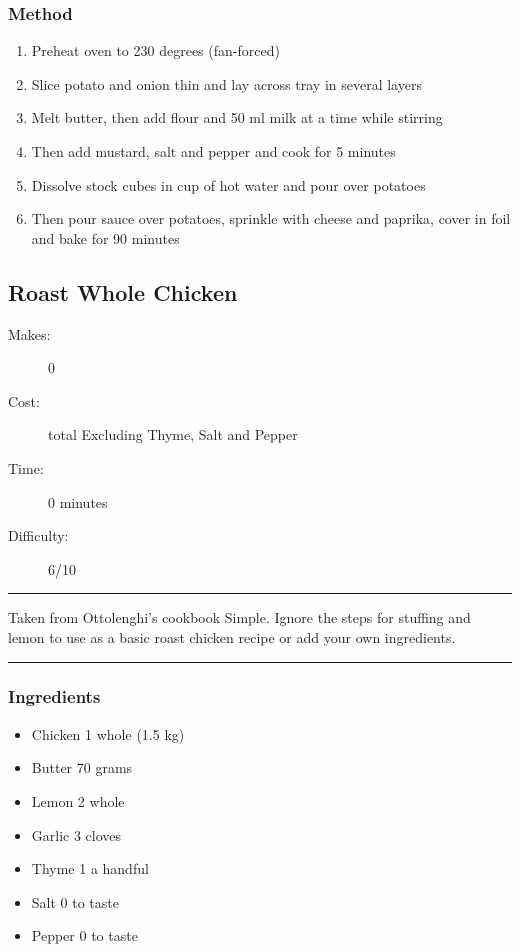 \documentclass[]{article}
\begin{document}
\subsubsection*{\Large Method}
\begin{enumerate}[font=\huge\color{accent}]
	\item Preheat oven to 230 degrees (fan-forced)
	\item Slice potato and onion thin and lay across tray in several layers
	\item Melt butter, then add flour and 50 ml milk at a time while stirring
	\item Then add mustard, salt and pepper and cook for 5 minutes
	\item Dissolve stock cubes in cup of hot water and pour over potatoes
	\item Then pour sauce over potatoes, sprinkle with cheese and paprika, cover in foil and bake for 90 minutes
\end{enumerate}
\newpage
{}\label{rec:Roast Whole Chicken}
\subsection*{\center\huge Roast Whole Chicken}
\begin{description}
\item[Makes:] 0 
\item[Cost:]  total Excluding Thyme, Salt and Pepper
\item[Time:] 0 minutes
\item[Difficulty:] 6/10
\end{description}
\vspace{0.2cm}\hrule\vspace{0.5cm}
\begin{adjustwidth}{0.5 cm}{0.5 cm}

Taken from Ottolenghi's cookbook Simple. Ignore the steps for stuffing and lemon to use as a basic roast chicken recipe or add your own ingredients. 

\end{adjustwidth}
\vspace{0.5cm}\hrule
\subsubsection*{\Large Ingredients}
\begin{multicols}{2}
\begin{itemize}
 \item Chicken \hfill 1 whole (1.5 kg)
 \item Butter \hfill 70 grams
 \item Lemon \hfill 2 whole
 \item Garlic \hfill 3 cloves
 \item Thyme \hfill 1 a handful
 \item Salt \hfill 0 to taste
 \item Pepper \hfill 0 to taste
\end{itemize}
\end{multicols}
\end{document}
